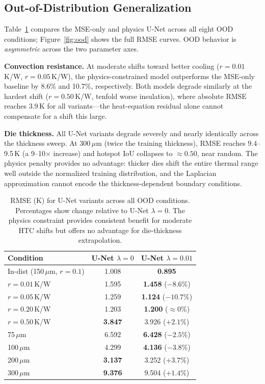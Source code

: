 \documentclass[10pt,twocolumn,letterpaper]{article}
\begin{document}
\subsection{Out-of-Distribution Generalization}

Table~\ref{tab:ood} compares the MSE-only and physics U-Net across
all eight OOD conditions; Figure~\ref{fig:ood} shows the full RMSE
curves. OOD behavior is \emph{asymmetric} across the two parameter
axes.

\textbf{Convection resistance.} At moderate shifts toward better
cooling ($r{=}0.01$\,K/W, $r{=}0.05$\,K/W), the physics-constrained
model outperforms the MSE-only baseline by 8.6\% and 10.7\%,
respectively. Both models degrade similarly at the hardest shift
($r{=}0.50$\,K/W, tenfold worse insulation), where absolute RMSE
reaches 3.9\,K for all variants---the heat-equation residual alone
cannot compensate for a shift this large.

\textbf{Die thickness.} All U-Net variants degrade severely and
nearly identically across the thickness sweep. At 300\,$\mu$m
(twice the training thickness), RMSE reaches 9.4--9.5\,K (a 9--10$\times$
increase) and hotspot IoU collapses to $\approx 0.50$, near random.
The physics penalty provides no advantage: thicker dies shift the
entire thermal range well outside the normalized training distribution,
and the Laplacian approximation cannot encode the thickness-dependent
boundary conditions.

\begin{table}[t]
\begin{center}
\small
\begin{tabular}{@{}lcc@{}}
\toprule
Condition & \makecell{U-Net\\$\lambda{=}0$} & \makecell{U-Net\\$\lambda{=}0.01$} \\
\midrule
In-dist (150\,$\mu$m, $r{=}0.1$) & 1.008 & \textbf{0.895} \\
\midrule
$r{=}0.01$\,K/W & 1.595 & \textbf{1.458} \;($-8.6\%$) \\
$r{=}0.05$\,K/W & 1.259 & \textbf{1.124} \;($-10.7\%$) \\
$r{=}0.20$\,K/W & 1.203 & \textbf{1.200} \;($\approx$0\%) \\
$r{=}0.50$\,K/W & \textbf{3.847} & 3.926 \;($+2.1\%$) \\
\midrule
75\,$\mu$m  & 6.592 & \textbf{6.428} \;($-2.5\%$) \\
100\,$\mu$m & 4.299 & \textbf{4.136} \;($-3.8\%$) \\
200\,$\mu$m & \textbf{3.137} & 3.252 \;($+3.7\%$) \\
300\,$\mu$m & \textbf{9.376} & 9.504 \;($+1.4\%$) \\
\bottomrule
\end{tabular}
\end{center}
\caption{RMSE (K) for U-Net variants across all OOD conditions.
Percentages show change relative to U-Net $\lambda{=}0$. The
physics constraint provides consistent benefit for moderate HTC
shifts but offers no advantage for die-thickness extrapolation.}
\label{tab:ood}
\end{table}
\end{document}
